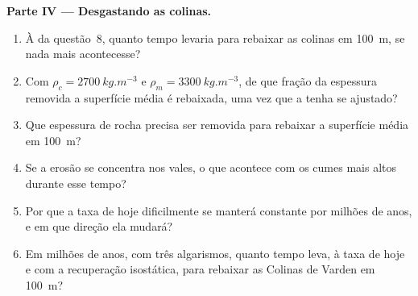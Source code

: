 \begin{problem}
\medskip
\noindent\textbf{Parte IV --- Desgastando as colinas.}
\begin{enumerate}[resume]
  \item À  da questão~8, quanto tempo levaria para rebaixar as colinas em \qty{100}{m}, se nada mais acontecesse?
  \item Com $\rho_c = \qty{2700}{kg.m^{-3}}$ e $\rho_m =
        \qty{3300}{kg.m^{-3}}$, de que fração da espessura removida a superfície média é rebaixada, uma vez que a  tenha se ajustado?
  \item Que espessura de rocha precisa ser removida para rebaixar a superfície média em \qty{100}{m}?
  \item Se a erosão se concentra nos vales, o que acontece com os cumes mais altos durante esse tempo?
  \item Por que a taxa de hoje dificilmente se manterá constante por milhões de anos, e em que direção ela mudará?
  \item Em milhões de anos, com três algarismos, quanto tempo leva, à taxa de hoje e com a recuperação isostática, para rebaixar as Colinas de Varden em \qty{100}{m}?
\end{enumerate}
\end{problem}
